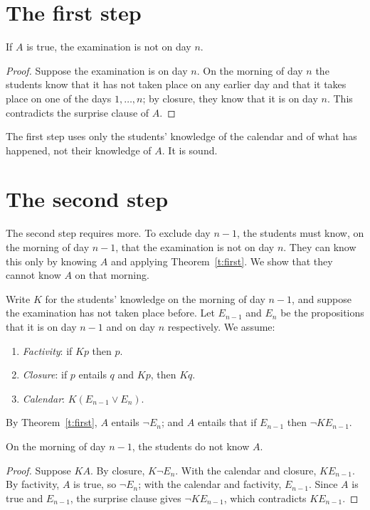 \documentclass{situationist-preprint}
\begin{document}
\section{The first step}

\begin{theorem}\label{t:first}
If $A$ is true, the examination is not on day $n$.
\end{theorem}

\begin{proof}
Suppose the examination is on day $n$. On the morning of day $n$ the students know that it has not taken place on any earlier day and that it takes place on one of the days $1, \dots, n$; by closure, they know that it is on day $n$. This contradicts the surprise clause of $A$.
\end{proof}

The first step uses only the students' knowledge of the calendar and of what has happened, not their knowledge of $A$. It is sound.

\section{The second step}

The second step requires more. To exclude day $n-1$, the students must know, on the morning of day $n-1$, that the examination is not on day $n$. They can know this only by knowing $A$ and applying Theorem~\ref{t:first}. We show that they cannot know $A$ on that morning.

Write $K$ for the students' knowledge on the morning of day $n-1$, and suppose the examination has not taken place before. Let $E_{n-1}$ and $E_n$ be the propositions that it is on day $n-1$ and on day $n$ respectively. We assume:
\begin{enumerate}[label=(\roman*)]
\item \emph{Factivity}: if $K p$ then $p$.
\item \emph{Closure}: if $p$ entails $q$ and $K p$, then $K q$.
\item \emph{Calendar}: $K(E_{n-1} \vee E_n)$.
\end{enumerate}
By Theorem~\ref{t:first}, $A$ entails $\neg E_n$; and $A$ entails that if $E_{n-1}$ then $\neg K E_{n-1}$.

\begin{theorem}\label{t:second}
On the morning of day $n-1$, the students do not know $A$.
\end{theorem}

\begin{proof}
Suppose $K A$. By closure, $K \neg E_n$. With the calendar and closure, $K E_{n-1}$. By factivity, $A$ is true, so $\neg E_n$; with the calendar and factivity, $E_{n-1}$. Since $A$ is true and $E_{n-1}$, the surprise clause gives $\neg K E_{n-1}$, which contradicts $K E_{n-1}$.
\end{proof}
\end{document}

